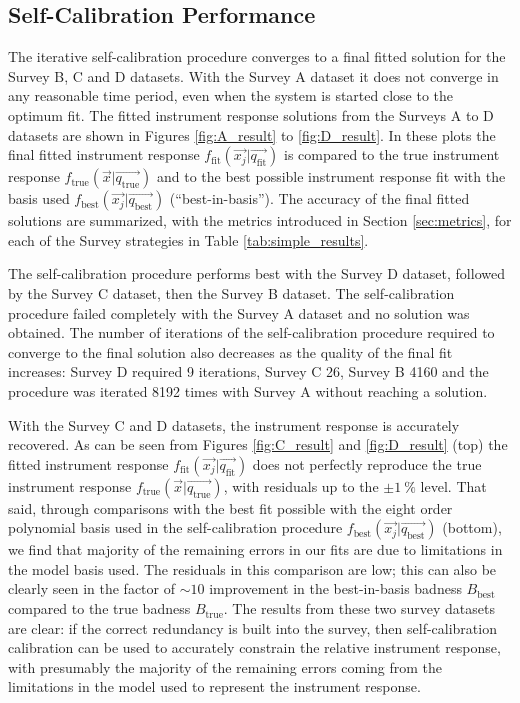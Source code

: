 \documentclass[manuscript]{aastex}
\newcommand{\true}{\text{true}}
\newcommand{\fit}{\text{fit}}
\newcommand{\basis}{\text{best}}
\begin{document}
\subsection{Self-Calibration Performance}
The iterative self-calibration procedure converges to a final fitted solution for the Survey B, C and D datasets. With the Survey A dataset it does not converge in any reasonable time period, even when the system is started close to the optimum fit. The fitted instrument response solutions from the Surveys A to D datasets are shown in Figures \ref{fig:A_result} to \ref{fig:D_result}. In these plots the final fitted instrument response $f_\fit(\vec{x_j} | \vec{q_\fit})$ is compared to the true instrument response $f_\true(\vec{x} | \vec{q_\true})$ and to the best possible instrument response fit with the basis used $f_\basis(\vec{x_j} | \vec{q_\basis})$ (``best-in-basis''). The accuracy of the final fitted solutions are summarized, with the metrics introduced in Section \ref{sec:metrics}, for each of the Survey strategies in Table \ref{tab:simple_results}. 

The self-calibration procedure performs best with the Survey D dataset, followed by the Survey C dataset, then the Survey B dataset. The self-calibration procedure failed completely with the Survey A dataset and no solution was obtained. The number of iterations of the self-calibration procedure required to converge to the final solution also decreases as the quality of the final fit increases: Survey D required 9 iterations, Survey C 26, Survey B 4160 and the procedure was iterated 8192 times with Survey A without reaching a solution.

With the Survey C and D datasets, the instrument response is accurately recovered. As can be seen from Figures \ref{fig:C_result} and \ref{fig:D_result} (top) the fitted instrument response $f_\fit(\vec{x_j} | \vec{q_\fit})$ does not perfectly reproduce the true instrument response $f_\true(\vec{x} | \vec{q_\true})$, with residuals up to the $\pm 1~\%$ level. That said, through comparisons with the best fit possible with the eight order polynomial basis used in the self-calibration procedure $f_\basis(\vec{x_j} | \vec{q_\basis})$ (bottom), we find that majority of the remaining errors in our fits are due to limitations in the model basis used. The residuals in this comparison are low; this can also be clearly seen in the factor of $\sim 10$ improvement in the best-in-basis badness $B_\basis$ compared to the true badness $B_\true$. The results from these two survey datasets are clear: if the correct redundancy is built into the survey, then self-calibration calibration can be used to accurately constrain the relative instrument response, with presumably the majority of the remaining errors coming from the limitations in the model used to represent the instrument response.
\end{document}
